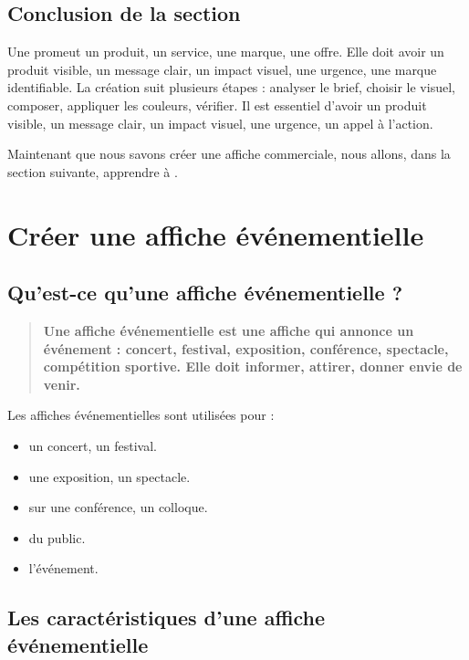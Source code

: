 \subsection*{Conclusion de la section}

Une  promeut un produit, un service, une marque, une offre. Elle doit avoir un produit visible, un message clair, un impact visuel, une urgence, une marque identifiable. La création suit plusieurs étapes : analyser le brief, choisir le visuel, composer, appliquer les couleurs, vérifier. Il est essentiel d'avoir un produit visible, un message clair, un impact visuel, une urgence, un appel à l'action.

Maintenant que nous savons créer une affiche commerciale, nous allons, dans la section suivante, apprendre à .

\section{Créer une affiche événementielle}

\subsection{Qu'est-ce qu'une affiche événementielle ?}

\begin{quote}
\textbf{Une affiche événementielle est une affiche qui annonce un événement : concert, festival, exposition, conférence, spectacle, compétition sportive. Elle doit informer, attirer, donner envie de venir.}
\end{quote}

Les affiches événementielles sont utilisées pour :

\begin{itemize}
    \item {} un concert, un festival.
    \item {} une exposition, un spectacle.
    \item {} sur une conférence, un colloque.
    \item {} du public.
    \item {} l'événement.
\end{itemize}

\subsection{Les caractéristiques d'une affiche événementielle}

